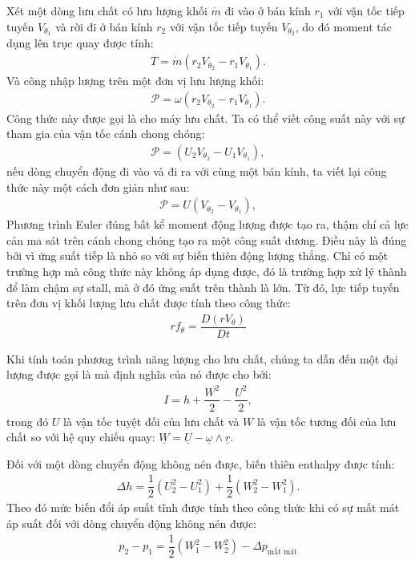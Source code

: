 \documentclass[MAY_THUY_KHI.tex]{subfiles}
\begin{document}
        Xét một dòng lưu chất có lưu lượng khối $\dot{m}$ đi vào ở bán kính $r_1$ với vận tốc tiếp tuyến $V_{\theta_1}$ và rời đi ở bán kính $r_2$ với vận tốc tiếp tuyến $ V_{\theta_2}$, do đó moment tác dụng lên trục quay được tính:
            \begin{align}
                T=\dot{m}(r_2 V_{\theta_2}-r_1 V_{\theta_1}).
            \end{align}
        Và công nhập lượng trên một đơn vị lưu lượng khối:
            \begin{align}
                \mathscr{P}=\omega(r_2 V_{\theta_2}-r_1 V_{\theta_1}).
            \end{align}
        Công thức này được gọi là  cho máy lưu chất. Ta có thể viết công suất này với sự tham gia của vận tốc cánh chong chóng:
            \begin{align}
                \mathscr{P}=(U_2V_{\theta_2}-U_1V_{\theta_1}),
            \end{align}
        nếu dòng chuyển động đi vào và đi ra với cùng một bán kính, ta viết lại công thức này một cách đơn giản như sau:
            \begin{align}
                \mathscr{P}=U(V_{\theta_2}-V_{\theta_1}),
            \end{align}
        Phương trình Euler đúng bất kể moment động lượng được tạo ra, thậm chí cả lực cản ma sát trên cánh chong chóng tạo ra một công suất dương. Điều này là đúng bởi vì ứng suất tiếp là nhỏ so với sự biến thiên động lượng thẳng. Chỉ có một trường hợp mà công thức này không áp dụng được, đó là trường hợp xử lý thành để làm chậm sự stall, mà ở đó ứng suất trên thành là lớn. Từ đó, lực tiếp tuyến trên đơn vị khối lượng lưu chất được tính theo công thức:
            \begin{align}
                rf_{\theta}=\dfrac{D\left(rV_{\theta}\right)}{Dt}
            \end{align}

        Khi tính toán phương trình năng lượng cho lưu chất, chúng ta dẫn đến một đại lượng được gọi là  mà định nghĩa của nó được cho bởi:
            \begin{align}
                I=h+\dfrac{W^2}{2}-\dfrac{U^2}{2},
            \end{align}
        trong đó $U$ là vận tốc tuyệt đối của lưu chất và $W$ là vận tốc tương đối của lưu chất so với hệ quy chiếu quay: $\underline{W}=\underline{U}-\underline{\omega}\wedge\underline{r}$.

        Đối với một dòng chuyển động không nén được, biến thiên enthalpy được tính:
            \begin{align}
                \Delta h=\dfrac{1}{2}\left(U_2^2-U_1^2\right)+\dfrac{1}{2}\left(W_2^2-W_1^2\right).
            \end{align}
        Theo đó mức biến đổi áp suất tĩnh được tính theo công thức khi có sự mất mát áp suất đối với dòng chuyển động không nén được:
            \begin{align}
                p_2-p_1=\dfrac{1}{2}\left(W_1^2-W_2^2\right)-\Delta p_{\text{mất mát}}
            \end{align}
\end{document}
